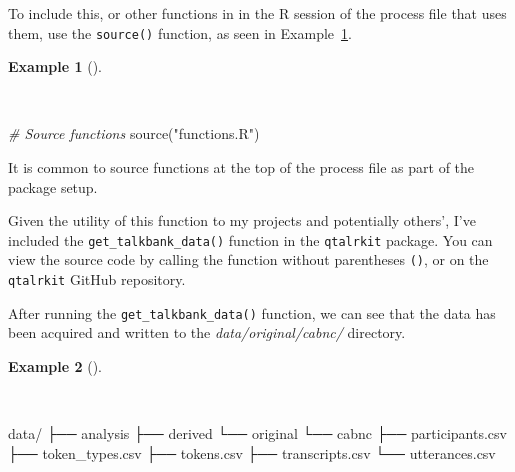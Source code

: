 \documentclass[
  letterpaper,
  DIV=11,
  numbers=noendperiod]{scrreprt}
\newenvironment{Shaded}{\begin{snugshade}}{\end{snugshade}}
\newcommand{\CommentTok}[1]{\textcolor[rgb]{0.00,0.00,0.00}{\textit{#1}}}
\newcommand{\ExtensionTok}[1]{\textcolor[rgb]{0.00,0.00,0.00}{#1}}
\newcommand{\FunctionTok}[1]{\textcolor[rgb]{0.00,0.00,0.00}{#1}}
\newcommand{\NormalTok}[1]{\textcolor[rgb]{0.00,0.00,0.00}{#1}}
\newcommand{\StringTok}[1]{\textcolor[rgb]{0.00,0.00,0.00}{#1}}
\theoremstyle{definition}
\newtheorem{example}{Example}[chapter]
\theoremstyle{remark}
\begin{document}
To include this, or other functions in in the R session of the process
file that uses them, use the \texttt{source()} function, as seen in
Example~\ref{exm-ad-source-functions}.

\begin{example}[]\protect\hypertarget{exm-ad-source-functions}{}\label{exm-ad-source-functions}

~

\begin{Shaded}
\begin{Highlighting}[]
\CommentTok{\# Source functions}
\FunctionTok{source}\NormalTok{(}\StringTok{"functions.R"}\NormalTok{)}
\end{Highlighting}
\end{Shaded}

\end{example}

It is common to source functions at the top of the process file as part
of the package setup.

Given the utility of this function to my projects and potentially
others', I've included the \texttt{get\_talkbank\_data()} function in
the \texttt{qtalrkit} package. You can view the source code by calling
the function without parentheses \texttt{()}, or on the
\texttt{qtalrkit} GitHub repository.

After running the \texttt{get\_talkbank\_data()} function, we can see
that the data has been acquired and written to the
\emph{data/original/cabnc/} directory.

\begin{example}[]\protect\hypertarget{exm-ad-functions-r}{}\label{exm-ad-functions-r}

~

\begin{Shaded}
\begin{Highlighting}[]
\ExtensionTok{data/}
\ExtensionTok{├──}\NormalTok{ analysis}
\ExtensionTok{├──}\NormalTok{ derived}
\ExtensionTok{└──}\NormalTok{ original}
    \ExtensionTok{└──}\NormalTok{ cabnc}
        \ExtensionTok{├──}\NormalTok{ participants.csv}
        \ExtensionTok{├──}\NormalTok{ token\_types.csv}
        \ExtensionTok{├──}\NormalTok{ tokens.csv}
        \ExtensionTok{├──}\NormalTok{ transcripts.csv}
        \ExtensionTok{└──}\NormalTok{ utterances.csv}
\end{Highlighting}
\end{Shaded}

\end{example}
\end{document}
